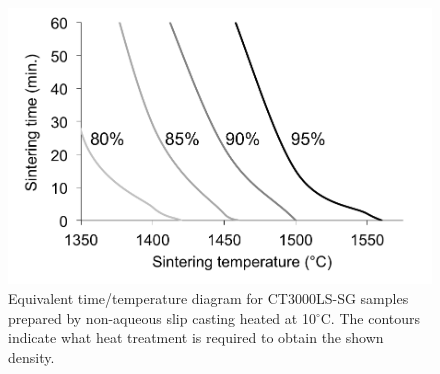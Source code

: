 \newpage
\begin{figure}[H]
	\centering
	\includegraphics[width=\textwidth]{Chapter-6/Figures/Figure13.png}
	\caption{Equivalent time/temperature diagram for CT3000LS-SG samples prepared by non-aqueous slip casting heated at 10$^{\circ}$C. The contours indicate what heat treatment is required to obtain the shown density.}
	\label{Ch6-figure:Figure13}
\end{figure}

